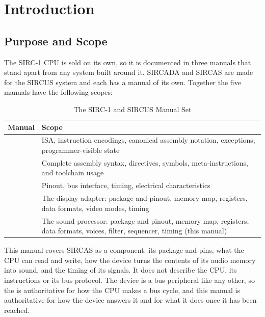\chapter{Introduction}
\label{ch:introduction}

\section{Purpose and Scope}

The SIRC-1 CPU is sold on its own, so it is documented in three manuals that stand apart from any system built around
it. SIRCADA and SIRCAS are made for the SIRCUS system and each has a manual of its own. Together the five manuals have
the following scopes:

\begin{table}[H]
	\centering
	\begin{tabular}{lp{8.2cm}}
		\toprule
		\textbf{Manual} & \textbf{Scope}                                                                                                                \\
		\midrule
		\archmanual{}   & ISA, instruction encodings, canonical assembly notation, exceptions, programmer-visible state                                 \\
		\asmmanual{}    & Complete assembly syntax, directives, symbols, meta-instructions, and toolchain usage                                         \\
		\hwmanual{}     & Pinout, bus interface, timing, electrical characteristics                                                                     \\
		\videomanual{}  & The display adapter: package and pinout, memory map, registers, data formats, video modes, timing                             \\
		\audiomanual{}  & The sound processor: package and pinout, memory map, registers, data formats, voices, filter, sequencer, timing (this manual) \\
		\bottomrule
	\end{tabular}
	\caption{The SIRC-1 and SIRCUS Manual Set}
	\label{tab:manual-set}
\end{table}

This manual covers SIRCAS as a component: its package and pins, what the CPU can read and write, how the device turns
the contents of its audio memory into sound, and the timing of its signals. It does not describe the CPU, its
instructions or its bus protocol. The device is a bus peripheral like any other, so the \hwmanual{} is authoritative
for how the CPU makes a bus cycle, and this manual is authoritative for how the device answers it and for what it does
once it has been reached.

